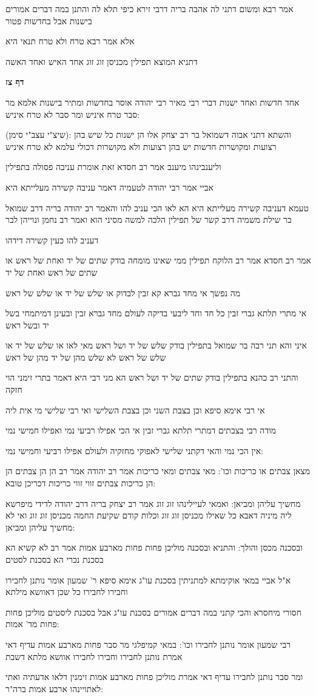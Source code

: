 \documentclass[12pt, openany]{book}
\newcommand{\sethebfont}{
\fontsize{10.5pt}{21.0pt} \selectfont
}
\newcommand{\textblock}[1]{
{\sethebfont #1\\}	
}
\newcommand{\sectname}{}
\newcommand{\newsection}[1]{
	\addcontentsline{toc}{section}{#1}
	\renewcommand{\sectname}{#1}	
	\vspace{-\baselineskip}
	\begin{center}
		\textbf{%
\fontsize{16pt}{16pt}\selectfont
			#1}
	\end{center}
	\vspace{-\baselineskip}
	\nopagebreak
}
\begin{document}
\textblock{אמר רבא ומשום דתני לה אהבה בריה דרבי זירא כיפי תלא לה והתנן במה דברים אמורים בישנות אבל בחדשות פטור}
\textblock{אלא אמר רבא טרח ולא טרח תנאי היא}
\textblock{דתניא המוצא תפילין מכניסן זוג זוג אחד האיש ואחד האשה}
\newsection{דף צז}
\textblock{אחד חדשות ואחד ישנות דברי רבי מאיר רבי יהודה אוסר בחדשות ומתיר בישנות אלמא מר סבר טרח איניש ומר סבר לא טרח איניש:}
\textblock{(שיצ"י עצב"י סימן): והשתא דתני אבוה דשמואל בר רב יצחק אלו הן ישנות כל שיש בהן רצועות ומקושרות חדשות יש בהן רצועות ולא מקושרות דכולי עלמא לא טרח איניש}
\textblock{וליענבינהו מיענב אמר רב חסדא זאת אומרת עניבה פסולה בתפילין}
\textblock{אביי אמר רבי יהודה לטעמיה דאמר עניבה קשירה מעלייתא היא}
\textblock{טעמא דעניבה קשירה מעלייתא היא הא לאו הכי עניב להו והאמר רב יהודה בריה דרב שמואל בר שילת משמיה דרב קשר של תפילין הלכה למשה מסיני הוא ואמר רב נחמן ונוייהן לבר}
\textblock{דעניב להו כעין קשירה דידהו}
\textblock{אמר רב חסדא אמר רב הלוקח תפילין ממי שאינו מומחה בודק שתים של יד ואחת של ראש או שתים של ראש ואחת של יד}
\textblock{מה נפשך אי מחד גברא קא זבין לבדוק או שלש של יד או שלש של ראש}
\textblock{אי מתרי תלתא גברי זבין כל חד וחד ליבעי בדיקה לעולם מחד גברא זבין ובעינן דמיתמחי בשל יד ובשל ראש}
\textblock{איני והא תני רבה בר שמואל בתפילין בודק שלש של יד ושל ראש מאי לאו או שלש של יד או שלש של ראש לא שלש מהן של יד מהן של ראש}
\textblock{והתני רב כהנא בתפילין בודק שתים של יד ושל ראש הא מני רבי היא דאמר בתרי זימני הוי חזקה}
\textblock{אי רבי אימא סיפא וכן בצבת השני וכן בצבת השלישי ואי רבי שלישי מי אית ליה}
\textblock{מודה רבי בצבתים דמתרי תלתא גברי זבין אי הכי אפילו רביעי נמי ואפילו חמישי נמי}
\textblock{אין הכי נמי והאי דקתני שלישי לאפוקי מחזקיה ולעולם אפילו רביעי וחמישי נמי:}
\textblock{מצאן צבתים או כריכות וכו': מאי צבתים ומאי כריכות אמר רב יהודה אמר רב הן הן צבתים הן הן כריכות צבתים זווי זווי כריכות דכריכן טובא:}
\textblock{מחשיך עליהן ומביאן: ואמאי לעיילינהו זוג זוג אמר רב יצחק בריה דרב יהודה לדידי מיפרשא ליה מיניה דאבא כל שאילו מכניסן זוג זוג וכלות קודם שקיעת החמה מכניסן זוג זוג ואי לא מחשיך עליהן ומביאן:}
\textblock{ובסכנה מכסן והולך: והתניא ובסכנה מוליכן פחות פחות מארבע אמות אמר רב לא קשיא הא בסכנת נכרי הא בסכנת לסטים}
\textblock{א"ל אביי במאי אוקימתא למתניתין בסכנת עו"ג אימא סיפא ר' שמעון אומר נותנן לחבירו וחבירו לחבירו כל שכן דאוושא מילתא}
\textblock{חסורי מיחסרא והכי קתני במה דברים אמורים בסכנת עו"ג אבל בסכנת ליסטים מוליכן פחות פחות מד' אמות:}
\textblock{רבי שמעון אומר נותנן לחבירו וכו': במאי קמיפלגי מר סבר פחות מארבע אמות עדיף דאי אמרת נותנן לחבירו וחבירו לחבירו אוושא מלתא דשבת}
\textblock{ומר סבר נותנן לחבירו עדיף דאי אמרת מוליכן פחות מארבע אמות זימנין דלאו אדעתיה ואתי לאתויינהו ארבע אמות ברה"ר:}
\end{document}
